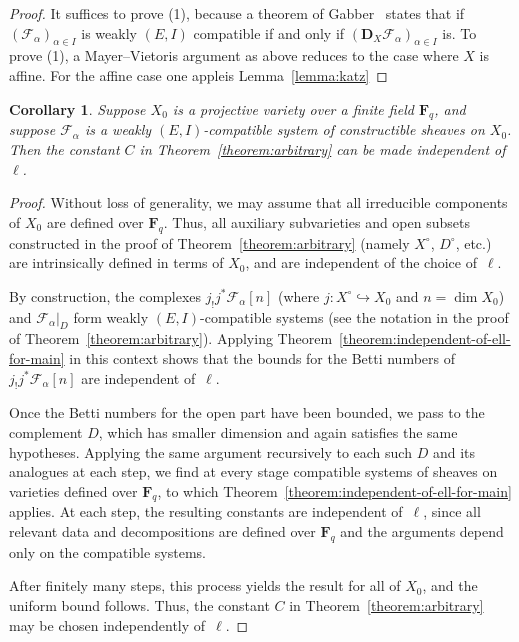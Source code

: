 \documentclass[english]{smfart}
\renewcommand{\mathbb}{\mathbf}
\theoremstyle{remark}
\theoremstyle{plain}
\newtheorem{corollary}[remark]{Corollary}
\theoremstyle{definition}
\numberwithin{equation}{remark}
\theoremstyle{void}
\begin{document}
\begin{proof}
It suffices to prove (1), because a theorem of
Gabber~\cite[Theorem~2]{fujiwara_gabber-independence-of-l-for-intersection-cohomology}
states that if \((\mathcal{F}_{\alpha})_{\alpha\in I}\) is weakly
\((E,I)\) compatible if and only if
\((\mathbb{D}_{X}\mathcal{F}_{\alpha})_{\alpha\in I}\) is.
To prove (1), a Mayer--Vietoris argument as above reduces to the case where \(X\) is affine.  For the affine case one appleis Lemma~\ref{lemma:katz}
\end{proof}

\begin{corollary}\label{corollary:independent-of-ell-for-arbitrary}
Suppose \(X_0\) is a projective variety over a finite field
\(\mathbb{F}_q\), and suppose \(\mathcal{F}_{\alpha}\) is a weakly
\((E,I)\)-compatible system of constructible sheaves on \(X_0\).  Then
the constant \(C\) in Theorem~\ref{theorem:arbitrary} can be made
independent of \(\ell\).
\end{corollary}

\begin{proof}
Without loss of generality, we may assume that all irreducible
components of \(X_0\) are defined over \(\mathbb{F}_q\).  Thus, all
auxiliary subvarieties and open subsets constructed in the proof of
Theorem~\ref{theorem:arbitrary} (namely \(X^\circ\), \(D^\circ\),
etc.) are intrinsically defined in terms of \(X_0\), and are
independent of the choice of~\(\ell\).

By construction, the complexes \(j_! j^* \mathcal{F}_\alpha[n]\)
(where \(j\colon X^\circ \hookrightarrow X_0\) and \(n = \dim X_0\))
and \(\mathcal{F}_\alpha|_D\) form weakly \((E,I)\)-compatible systems
(see the notation in the proof of Theorem~\ref{theorem:arbitrary}).
Applying Theorem~\ref{theorem:independent-of-ell-for-main} in this
context shows that the bounds for the Betti numbers of
\(j_! j^* \mathcal{F}_\alpha[n]\) are independent of~\(\ell\).

Once the Betti numbers for the open part have been bounded, we pass to
the complement \(D\), which has smaller dimension and again satisfies
the same hypotheses.  Applying the same argument recursively to each
such \(D\) and its analogues at each step, we find at every stage
compatible systems of sheaves on varieties defined over
\(\mathbb{F}_q\), to which
Theorem~\ref{theorem:independent-of-ell-for-main} applies.  At each
step, the resulting constants are independent of~\(\ell\), since all
relevant data and decompositions are defined over \(\mathbb{F}_q\) and
the arguments depend only on the compatible systems.

After finitely many steps, this process yields the result for all of
\(X_0\), and the uniform bound follows.  Thus, the constant \(C\) in
Theorem~\ref{theorem:arbitrary} may be chosen independently
of~\(\ell\).
\end{proof}
\end{document}
